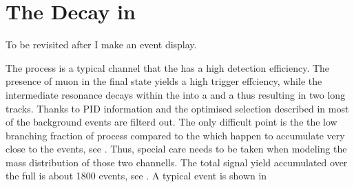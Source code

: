 \section{The \BJpsiKst Decay in \lhcb}
\label{BspsiKst_at_lhcb}
{\color{red} To be revisited after I make an event display.}

The \BsJpsiKst process is a typical channel that the \lhcb has a high detection efficiency.
The presence of muon in the final state yields a high trigger effciency, while the intermediate
\Kstar resonance decays within the \velo into a \kaon and a \pion thus resulting in two long tracks.
Thanks to PID information and the optimised selection described in  most of the background
events are filterd out. The only difficult point is the the low branching fraction of \BsJpsiKst process
compared to the \BdJpsiKst which happen to accumulate very close to the \BsJpsiKst events, see .
Thus, special care needs to be taken when modeling the mass distribution of those two channells.
The total \BsJpsiKst signal yield accumulated over the full \runone is about 1800 events, see .
A typical \BsJpsiKst event is  shown in 


